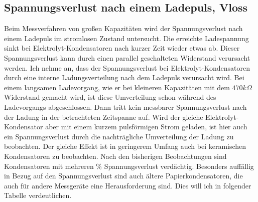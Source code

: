 \subsection{Spannungsverlust nach einem Ladepuls, Vloss}
Beim Messverfahren von großen Kapazitäten wird der Spannungsverlust nach einem Ladepuls im stromlosen Zustand untersucht.
Die erreichte Ladespannung sinkt bei Elektrolyt-Kondensatoren nach kurzer Zeit wieder etwas ab.
Dieser Spannungsverlust kann durch einen parallel geschalteten Widerstand verursacht werden.
Ich nehme an, dass der Spannungsverlust bei Elektrolyt-Kondensatoren durch eine interne Ladungsverteilung nach
dem Ladepuls verursacht wird. Bei einem langsamen Ladevorgang, wie er bei kleineren Kapazitäten mit dem \(470k\Omega\) Widerstand
gemacht wird, ist diese Umverteilung schon während des Ladevorgangs abgeschlossen. Dann tritt kein messbarer Spannungsverlust nach
der Ladung in der betrachteten Zeitspanne auf. Wird der gleiche Elektrolyt-Kondensator aber mit einem
kurzem pulsförmigen Strom geladen, ist hier auch ein Spannungsverlust durch die nachträgliche Umverteilung
der Ladung zu beobachten. Der gleiche Effekt ist in geringerem Umfang auch bei keramischen Kondensatoren zu beobachten. 
Nach den bisherigen Beobachtungen sind Kondensatoren mit mehreren \% Spannungsverlust verdächtig.
Besonders auffällig in Bezug auf den Spannungsverlust sind auch ältere Papierkondensatoren, die auch für andere Messgeräte
eine Herausforderung sind. Dies will ich in folgender Tabelle verdeutlichen.
\vspace{0.5 cm}

